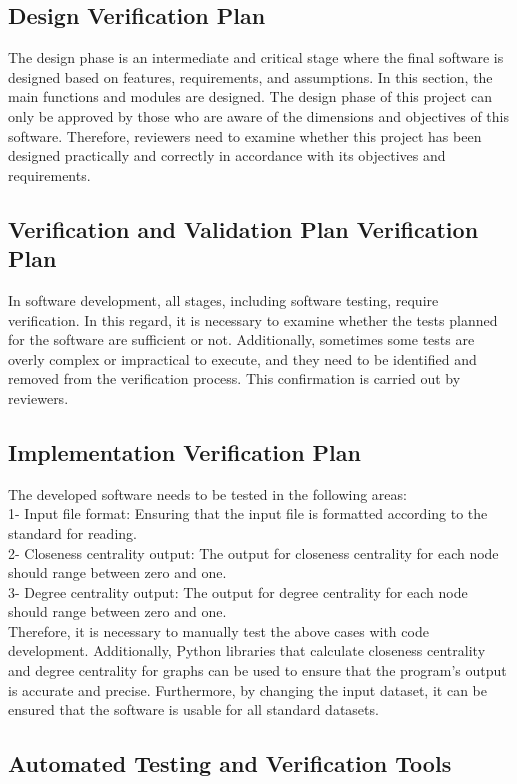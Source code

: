 \documentclass[12pt, titlepage]{article}
\begin{document}
\subsection{Design Verification Plan}
The design phase is an intermediate and critical stage where the final software is designed based on features, requirements, and assumptions. In this section, the main functions and modules are designed.
The design phase of this project can only be approved by those who are aware of the dimensions and objectives of this software. Therefore, reviewers need to examine whether this project has been designed practically and correctly in accordance with its objectives and requirements.

\subsection{Verification and Validation Plan Verification Plan}
In software development, all stages, including software testing, require verification. In this regard, it is necessary to examine whether the tests planned for the software are sufficient or not. Additionally, sometimes some tests are overly complex or impractical to execute, and they need to be identified and removed from the verification process. This confirmation is carried out by reviewers.
\subsection{Implementation Verification Plan}


The developed software needs to be tested in the following areas:\\
1- Input file format: Ensuring that the input file is formatted according to the standard for reading.\\
2- Closeness centrality output: The output for closeness centrality for each node should range between zero and one.\\
3- Degree centrality output: The output for degree centrality for each node should range between zero and one.\\
Therefore, it is necessary to manually test the above cases with code development. Additionally, Python libraries that calculate closeness centrality and degree centrality for graphs can be used to ensure that the program's output is accurate and precise.
Furthermore, by changing the input dataset, it can be ensured that the software is usable for all standard datasets.

\subsection{Automated Testing and Verification Tools}
\end{document}
